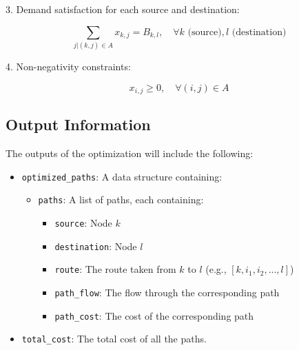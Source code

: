 \documentclass{article}
\begin{document}
3. Demand satisfaction for each source and destination:

\[
\sum_{j | (k,j) \in A} x_{k,j} = B_{k,l}, \quad \forall k \text{ (source)}, l \text{ (destination)}
\]

4. Non-negativity constraints:

\[
x_{i,j} \geq 0, \quad \forall (i,j) \in A
\]

\subsection*{Output Information}
The outputs of the optimization will include the following:
\begin{itemize}
    \item \texttt{optimized\_paths}: A data structure containing:
    \begin{itemize}
        \item \texttt{paths}: A list of paths, each containing:
        \begin{itemize}
            \item \texttt{source}: Node \( k \)
            \item \texttt{destination}: Node \( l \)
            \item \texttt{route}: The route taken from \( k \) to \( l \) (e.g., \([k, i_1, i_2, ..., l]\))
            \item \texttt{path\_flow}: The flow through the corresponding path
            \item \texttt{path\_cost}: The cost of the corresponding path
        \end{itemize}
    \end{itemize}
    \item \texttt{total\_cost}: The total cost of all the paths.
\end{itemize}
\end{document}
